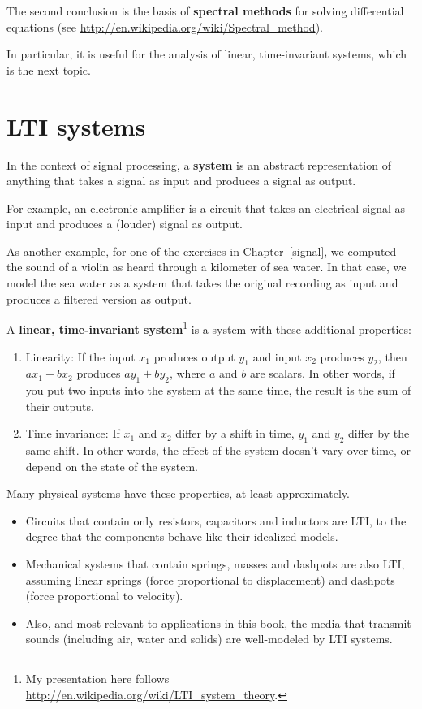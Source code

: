 \documentclass[12pt]{book}
\begin{document}
The second conclusion is the basis of {\bf spectral methods} for
solving differential equations (see
\url{http://en.wikipedia.org/wiki/Spectral_method}).

In particular, it is useful for the analysis of linear, time-invariant
systems, which is the next topic.


\section{LTI systems}

In the context of signal processing, a {\bf system} is an abstract
representation of anything that takes a signal as input and produces
a signal as output.

For example, an electronic amplifier is a circuit that takes an
electrical signal as input and produces a (louder) signal as output.

As another example, for one of the exercises in Chapter~\ref{signal},
we computed the sound of a violin as heard through a kilometer of sea
water.  In that case, we model the sea water as a system that takes
the original recording as input and produces a filtered version as
output.

A {\bf linear, time-invariant system}\footnote{My presentation here
  follows \url{http://en.wikipedia.org/wiki/LTI_system_theory}.} is a
system with these additional properties:

\begin{enumerate}

\item Linearity: If the input $x_1$ produces output $y_1$ and input
  $x_2$ produces $y_2$, then $a x_1 + b x_2$ produces $a y_1 + b y_2$,
  where $a$ and $b$ are scalars.  In other words, if you put two
  inputs into the system at the same time, the result is the sum of
  their outputs.  

\item Time invariance: If $x_1$ and $x_2$ differ by a shift in time,
  $y_1$ and $y_2$ differ by the same shift.  In other words, the
  effect of the system doesn't vary over time, or depend on the state
  of the system.

\end{enumerate}

Many physical systems have these properties, at least approximately.

\begin{itemize}

\item Circuits that contain only resistors, capacitors and inductors are
LTI, to the degree that the components behave like their idealized
models.

\item Mechanical systems that contain springs, masses and
dashpots are also LTI, assuming linear springs (force proportional
to displacement) and dashpots (force proportional to velocity).

\item Also, and most relevant to applications in this book,
the media that transmit sounds (including air, water
and solids) are well-modeled by LTI systems.

\end{itemize}
\end{document}
